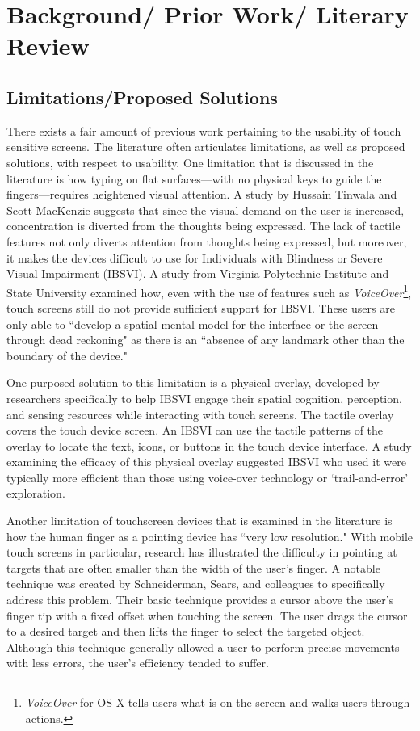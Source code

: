 \documentclass{article}
\begin{document}
\section{Background/ Prior Work/ Literary Review}
\subsection{Limitations/Proposed Solutions}
There exists a fair amount of previous work pertaining to the usability of touch sensitive screens. The literature often articulates limitations, as well as proposed solutions, with respect to usability. One limitation that is discussed in the literature is how typing on flat surfaces---with no physical keys to guide the fingers---requires heightened visual attention. A study by Hussain Tinwala and Scott MacKenzie suggests that since the visual demand on the user is increased, concentration is diverted from the thoughts being expressed. \cite{Tinwala:2010:ETE:1868914.1868972} The lack of tactile features not only diverts attention from thoughts being expressed, but moreover, it makes the devices difficult to use for Individuals with Blindness or Severe Visual Impairment (IBSVI). A study from Virginia Polytechnic Institute and State University examined how, even with the use of features such as  \textit{VoiceOver}\footnote{\textit{VoiceOver} for OS X tells users what is on the screen and walks users through actions.\cite{VoiceOver}}, touch screens still do not provide sufficient support for IBSVI. These users are only able to ``develop a spatial mental model for the interface or the screen through dead reckoning" as there is an ``absence of any landmark other than the boundary of the device." \cite{El-Glaly:2013:TTF:2460625.2460665} 

One purposed solution to this limitation is a physical overlay, developed by researchers specifically to help IBSVI engage their spatial cognition, perception, and sensing resources while interacting with touch screens.  \cite{El-Glaly:2013:TTF:2460625.2460665} The tactile overlay covers the touch device screen. An IBSVI can use the tactile patterns of the overlay to locate the text, icons, or buttons in the touch device interface. A study examining the efficacy of this physical overlay suggested IBSVI who used it were typically more efficient than those using voice-over technology or `trail-and-error' exploration. \cite{El-Glaly:2013:TTF:2460625.2460665}


Another limitation of touchscreen devices that is examined in the literature is how the human finger as a pointing device has ``very low resolution."\cite{Albinsson} With mobile touch screens in particular, research has illustrated the difficulty in pointing at targets that are often smaller than the width of the user's finger. A notable technique was created by Schneiderman, Sears, and colleagues to specifically address this problem.\cite{Sears} Their basic technique provides a cursor above the user's finger tip with a fixed offset when touching the screen. The user drags the cursor to a desired target and then lifts the finger to select the targeted object. Although this technique generally allowed a user to perform precise movements with less errors, the user's efficiency tended to suffer.\cite{Sears}
\end{document}
